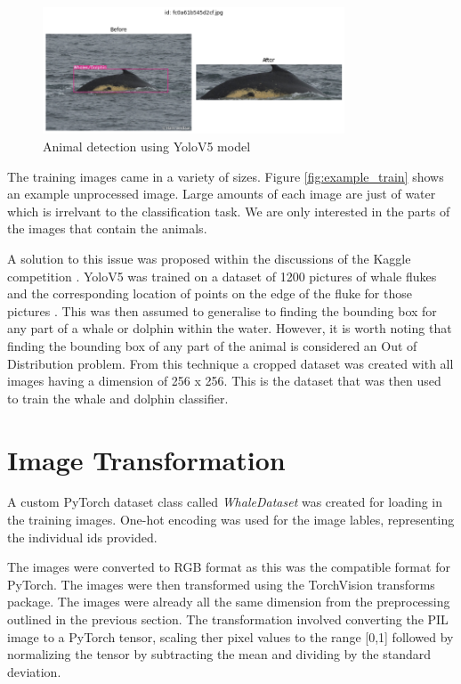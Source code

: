 \documentclass{article}
\begin{document}
\begin{figure}
    \centering
    \includegraphics[width=0.8\textwidth]{image_cropping.png}
    \caption{Animal detection using YoloV5 model}
    \label{fig:image_cropping}
\end{figure}


The training images came in a variety of sizes. Figure \ref{fig:example_train} shows an example unprocessed image. Large amounts of each image are just of water which is irrelvant to the classification task. We are only interested in the parts of the 
images that contain the animals.

A solution to this issue was proposed within the discussions of the Kaggle competition \cite{cropped_dataset_kaggle}. YoloV5 was trained on a dataset of 1200 pictures of whale flukes and the corresponding location of points on the edge of the fluke for those pictures \cite{whale_fluke_dataset}. 
This was then assumed to generalise to finding the bounding box for any part of a whale or dolphin within the water. However, it is worth noting that finding the bounding box of any part of the animal is considered an Out of Distribution problem. From this technique a cropped dataset was created with all images having a dimension of 256 x 256. This is the dataset that was then used to train the whale 
and dolphin classifier.


\section {Image Transformation}

A custom PyTorch dataset class called \emph{WhaleDataset} was created for loading in the training images. One-hot encoding was used for the image lables, representing the individual ids provided.

The images were converted to RGB format as this was the compatible format for PyTorch. The images were then transformed using the TorchVision transforms package. The images were already all the same dimension from the preprocessing outlined in the previous section. 
The transformation involved converting the PIL image to a PyTorch tensor, scaling ther pixel values to the range [0,1] followed by normalizing the tensor by subtracting the mean and dividing by the standard deviation.
\end{document}
